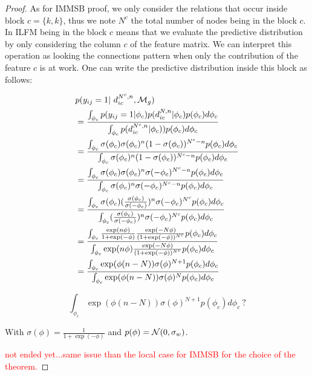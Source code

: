 \begin{proof}
As for IMMSB proof, we only consider the relations  that occur inside block $c=\{k,k\}$, thus we note $N^c$ the total number of nodes being in the block $c$. In ILFM being in the block $c$ means that we evaluate the predictive distribution by only considering the column $c$ of the feature matrix. We can interpret this operation as looking the connections pattern when only the contribution of the feature $c$ is at work. One can write the predictive distribution inside this block as follows:

\begin{align*}
&\p(y_{ij}=1 | d_{ic}^{N^c,n}, \M_g)  \\
&=  \frac{ \int_{\phi_{c}} p(y_{ij}=1|\phi_{c}) p(d_{ic}^{N,n} | \phi_{c}) p(\phi_{c}) d\phi_{c}}{\int_{\phi_{c}} \p(d_{ic}^{N^c,n} | \phi_{c}))       p(\phi_{c}) d\phi_{c}} \\
&= \frac{ \int_{\phi_{c}} \sigma(\phi_c) \sigma(\phi_c)^n (1-\sigma(\phi_c))^{N^c-n}     p(\phi_{c}) d\phi_{c}}{\int_{\phi_{c}}  \sigma(\phi_c)^n (1-\sigma(\phi_c))^{N^c-n}      p(\phi_{c}) d\phi_{c}} \\
&= \frac{ \int_{\phi_{c}} \sigma(\phi_c) \sigma(\phi_c)^n \sigma(-\phi_c)^{N^c-n}     p(\phi_{c}) d\phi_{c}}{\int_{\phi_{c}}  \sigma(\phi_c)^n \sigma(-\phi_c)^{N^c-n}      p(\phi_{c}) d\phi_{c}} \\
&= \frac{ \int_{\phi_{c}} \sigma(\phi_c) (\frac{\sigma(\phi_c)}{\sigma(-\phi_c)})^n \sigma(-\phi_c)^{N^c}     p(\phi_{c}) d\phi_{c}}{\int_{\phi_{c}}  (\frac{\sigma(\phi_c)}{\sigma(-\phi_c)})^n \sigma(-\phi_c)^{N^c}     p(\phi_{c}) d\phi_{c}} \\
&= \frac{ \int_{\phi_{c}} \frac{\exp(n\phi)}{1+\exp(-\phi)} \frac{\exp(-N\phi)}{(1+\exp(-\phi))^{N^c}}  p(\phi_{c}) d\phi_{c}}{\int_{\phi_{c}}  \exp(n\phi) \frac{\exp(-N\phi)}{(1+\exp(-\phi))^{N^c}}   p(\phi_{c}) d\phi_{c}} \\
&= \frac{ \int_{\phi_{c}} \exp(\phi(n-N)) \sigma(\phi)^{N+1} p(\phi_{c}) d\phi_{c}}{\int_{\phi_{c}} \exp(\phi(n-N)) \sigma(\phi)^{N} p(\phi_{c}) d\phi_{c}} \\
\end{align*}

\begin{equation}
\int_{\phi_{c}} \exp(\phi(n-N)) \sigma(\phi)^{N+1} p(\phi_{c}) d\phi_{c} \ ?
\end{equation}


With $\sigma(\phi) = \frac{1}{1+\exp(-\phi)}$ and $p(\phi) = \mathcal{N}(0, \sigma_w)$.



\textcolor{red}{not ended yet...same issue than the local case for IMMSB for the choice of the theorem.}
\end{proof}

